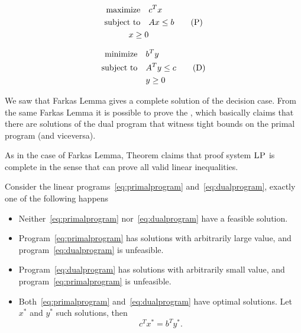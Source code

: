 \documentclass[a4paper,twoside,justified]{tufte-handout}
\begin{document}
\begin{figure}
\begin{minipage}[t]{0.5\textwidth}%
\begin{alignat}{2}
  \maximize c^{T}x\notag\\
\label{eq:primalprogram}\subjectto Ax \leq b \tag{P}\\
  x\geq 0 \notag
\end{alignat}
\end{minipage}
\begin{minipage}[t]{0.5\textwidth}%
\begin{alignat}{2}
  \minimize b^{T}y \notag\\
  \label{eq:dualprogram}  \subjectto A^{T}y \leq c \tag{D}\\
  & y \geq 0\notag
\end{alignat}
\end{minipage}
\end{figure}

We saw that Farkas Lemma gives a complete solution of the decision
case. From the same Farkas Lemma it is possible to prove the
, which basically claims that there are
solutions of the dual program that witness tight bounds on the primal
program (and viceversa).

\begin{marginfigure}
  As in the case of Farkas Lemma,
  Theorem claims that proof system $\textsc{LP}$ is complete in
  the sense that can prove all valid linear inequalities.
\end{marginfigure}

\begin{theorem}
  Consider the linear programs~\eqref{eq:primalprogram}
  and~\eqref{eq:dualprogram}, exactly one of the following happens
  \begin{itemize}
    \item Neither~\eqref{eq:primalprogram} nor~\eqref{eq:dualprogram} have a
    feasible solution.
    \item Program~\eqref{eq:primalprogram} has solutions with
    arbitrarily large value, and program~\eqref{eq:dualprogram} is
    unfeasible.
    \item Program~\eqref{eq:dualprogram} has solutions with
    arbitrarily small value, and program~\eqref{eq:primalprogram} is
    unfeasible.
    \item Both~\eqref{eq:primalprogram} and~\eqref{eq:dualprogram}
    have optimal solutions. Let $ x^{*}$ and $ y^{*}$ such solutions, then
    \begin{equation*}
      c^{T} x^{*}=b^{T}y^{*}.
    \end{equation*}
  \end{itemize}
\end{theorem}
\end{document}
